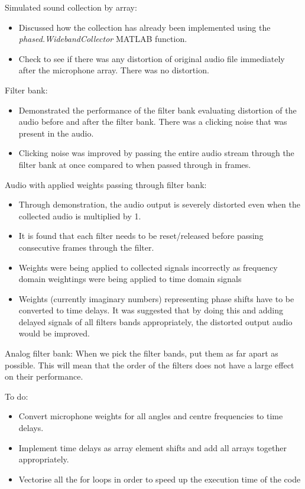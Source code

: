 \documentclass[10pt,onecolumn]{witseiepaper}
\begin{document}
Simulated sound collection by array:
\begin{itemize}
	\item Discussed how the collection has already been implemented using the \textit{phased.WidebandCollector} MATLAB function.
	\item Check to see if there was any distortion of original audio file immediately after the microphone array. There was no distortion.
\end{itemize}

Filter bank:
\begin{itemize}
	\item Demonstrated the performance of the filter bank evaluating distortion of the audio before and after the filter bank. There was a clicking noise that was present in the audio.
	\item Clicking noise was improved by passing the entire audio stream through the filter bank at once compared to when passed through in frames.
\end{itemize}

Audio with applied weights passing through filter bank:
\begin{itemize}
	\item Through demonstration, the audio output is severely distorted even when the collected audio is multiplied by 1.
	\item It is found that each filter needs to be reset/released before passing consecutive frames through the filter.
	\item Weights were being applied to collected signals incorrectly as frequency domain weightings were being applied to time domain signals
	\item Weights (currently imaginary numbers) representing phase shifts have to be converted to time delays. It was suggested that by doing this and adding delayed signals of all filters bands appropriately, the distorted output audio would be improved.
\end{itemize}

Analog filter bank:
When we pick the filter bands, put them as far apart as possible. This will mean that the order of the filters does not have a large effect on their performance.

To do:
\begin{itemize}
	\item Convert microphone weights for all angles and centre frequencies to time delays.
	\item Implement time delays as array element shifts and add all arrays together appropriately.
	\item Vectorise all the for loops in order to speed up the execution time of the code
\end{itemize}
\end{document}
